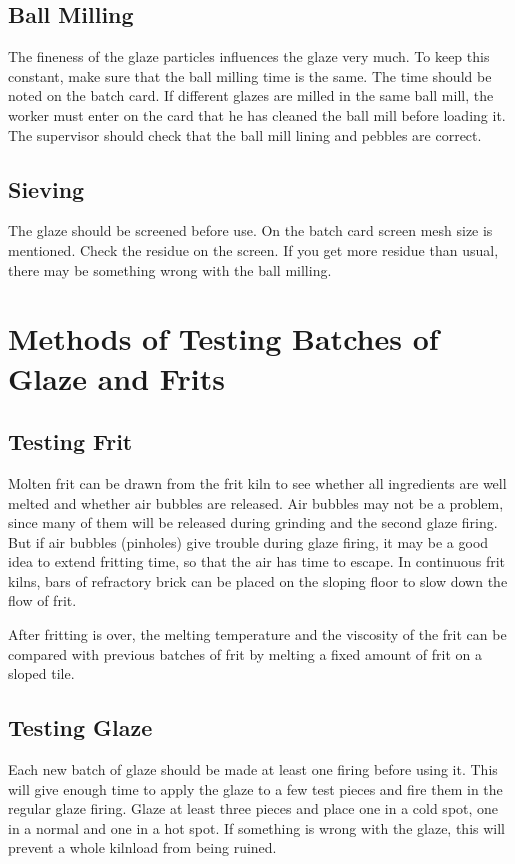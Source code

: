 \subsection{Ball Milling}
The fineness of the glaze particles influences the glaze very much. To keep 
this constant, make sure that the ball milling time is the same. The time 
should be noted on the batch card. If different glazes are milled in the same 
ball mill, the worker must enter on the card that he has cleaned the ball mill 
before loading it. The supervisor should check that the ball mill lining and 
pebbles are correct.
\subsection{Sieving}
The glaze should be screened before use. On the batch card screen mesh size is 
mentioned. Check the residue on the screen. If you get more residue than usual, 
there may be something wrong with the ball milling.
\section{Methods of Testing Batches of Glaze and Frits}
\subsection{Testing Frit}
Molten frit can be drawn from the frit kiln to see whether all ingredients are 
well melted and whether air bubbles are released. Air bubbles may not be a 
problem, since many of them will be released during grinding and the second 
glaze firing. But if air bubbles (pinholes) give trouble during glaze firing, 
it may be a good idea to extend fritting time, so that the air has time to 
escape. In continuous frit kilns, bars of refractory brick can be placed on the 
sloping floor to slow down the flow of frit.

After fritting is over, the melting temperature and the viscosity of the frit 
can be compared with previous batches of frit by melting a fixed amount of frit 
on a sloped tile.
\subsection{Testing Glaze}
Each new batch of glaze should be made at least one firing before using it. 
This will give enough time to apply the glaze to a few test pieces and fire 
them in the regular glaze firing. Glaze at least three pieces and place one in 
a cold spot, one in a normal and one in a hot spot. If something is wrong with 
the glaze, this will prevent a whole kilnload from being ruined.

